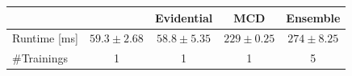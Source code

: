 \begin{tabular}{lcccc}
\toprule
{} & \oursacro{} & Evidential & MCD & Ensemble\\
\midrule
Runtime [ms]  & $59.3 \pm 2.68$ & $58.8 \pm 5.35$ & $229 \pm 0.25$ & $274 \pm 8.25$\\
\#Trainings         & 1 & 1 & 1 & 5\\
\bottomrule
\end{tabular}
